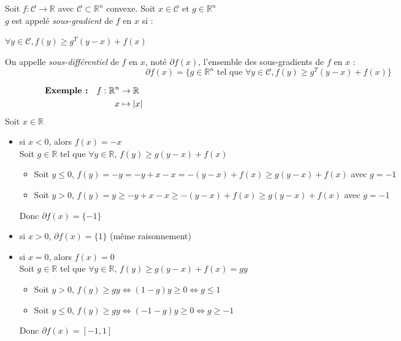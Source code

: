 \documentclass[12pt,a4paper]{article}
\newcommand{\definition}[2]{%
    \begin{tcolorbox}[colback=white,colframe=blue!25!white,title=\textbf{Définition #1}, coltitle=black]
        #2
    \end{tcolorbox}
}
\begin{document}
\definition{- Sous-differentiel et sous-gradient}{
    Soit $f : \mathcal{C} \rightarrow \mathbb{R}$ avec $\mathcal{C} \subset \mathbb{R}^n$ convexe.
    Soit $x \in \mathcal{C}$ et $g \in \mathbb{R}^n$\\
    $g$ est appelé \textit{sous-gradient} de $f$ en $x$ si :
    \begin{center}
        $\forall y \in \mathcal{C}, f(y) \geq g^T (y - x) + f(x)$
    \end{center}
    On appelle \textit{sous-différentiel} de $f$ en $x$, noté $\partial f(x)$, l'ensemble des sous-gradients de $f$ en $x$ :
    $$
    \partial f(x) = \{g \in \mathbb{R}^n \text{ tel que } \forall y \in \mathcal{C}, f(y) \geq g^T (y - x) + f(x)\}
    $$
}


\begin{align*}
    \noindent\textbf{Exemple :} \quad f : \mathbb{R}^n &\rightarrow \mathbb{R} \hspace{14.5cm}\\
    x &\mapsto |x|
\end{align*}
Soit $x \in \mathbb{R}$
\begin{itemize}
    \item si $x < 0$, alors $f(x) = -x$\\
    Soit $g \in \mathbb{R}$ tel que $\forall y \in \mathbb{R}$, $f(y) \geq g(y - x) + f(x)$
    \begin{itemize}
        \item Soit $y \leq 0$, $f(y) = -y = -y + x - x = -(y-x) + f(x) \geq g(y - x) + f(x)$ avec $g = -1$
        \item Soit $y > 0$, $f(y) = y \geq -y + x - x \geq -(y - x) + f(x) \geq g(y - x) + f(x)$ avec $g = -1$
    \end{itemize}
    Donc $\partial f(x) = \{-1\}$
    \item si $x > 0$, $\partial f(x) = \{1\}$ (même raisonnement)
    \item si $x = 0$, alors $f(x) = 0$\\
    Soit $g \in \mathbb{R}$ tel que $\forall y \in \mathbb{R}$, $f(y) \geq g(y - x) + f(x) = gy$
    \begin{itemize}
        \item Soit $y > 0$, $f(y) \geq gy \Leftrightarrow (1-g)y \geq 0 \Leftrightarrow g \leq 1$\\
        \item Soit $y \leq 0$, $f(y) \geq gy \Leftrightarrow (-1-g)y \geq 0 \Leftrightarrow g \geq -1$\\
    \end{itemize}
    Donc $\partial f(x) = [-1, 1]$\\
\end{itemize}
\end{document}
